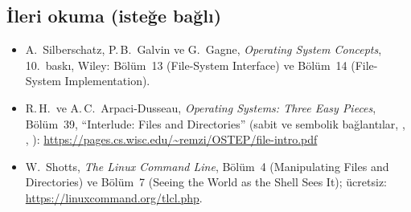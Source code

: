 \subsection*{İleri okuma (isteğe bağlı)}
\begin{itemize}
  \item A.\ Silberschatz, P.\,B.\ Galvin ve G.\ Gagne, \emph{Operating System Concepts}, 10.\ baskı, Wiley: Bölüm~13 (File-System Interface) ve Bölüm~14 (File-System Implementation).
  \item R.\,H.\ ve A.\,C.\ Arpaci-Dusseau, \emph{Operating Systems: Three Easy Pieces}, Bölüm~39, ``Interlude: Files and Directories'' (sabit ve sembolik bağlantılar, , , ): \url{https://pages.cs.wisc.edu/~remzi/OSTEP/file-intro.pdf}
  \item W.\ Shotts, \emph{The Linux Command Line}, Bölüm~4 (Manipulating Files and Directories) ve Bölüm~7 (Seeing the World as the Shell Sees It); ücretsiz: \url{https://linuxcommand.org/tlcl.php}.
\end{itemize}

